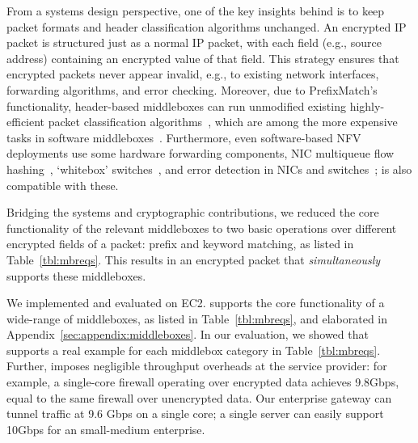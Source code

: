   From a systems design perspective, one of the key insights behind \sys is to keep packet formats and header classification algorithms unchanged. An encrypted IP packet is structured just as a normal IP packet, with each field (e.g., source address) containing an encrypted value of that field.
  This strategy ensures that encrypted packets never appear invalid, e.g., to existing network interfaces, forwarding algorithms, and error checking. 
Moreover, due to PrefixMatch's functionality,  header-based middleboxes can  run unmodified existing highly-efficient packet classification algorithms~\cite{packet_classif}, which are among the more expensive tasks in software 
middleboxes~\cite{comb}.
   Furthermore, even software-based NFV deployments use  some hardware forwarding components, \eg{} NIC multiqueue flow hashing~\cite{nicdocument}, `whitebox' switches~\cite{whitebox}, and error detection in NICs and switches~\cite{nicdocument, ciscov6}; \sys is also compatible with these. %
  
Bridging the systems and cryptographic contributions, we reduced the core functionality of the relevant middleboxes to two basic operations over different encrypted fields of a packet: prefix and keyword matching, as listed in Table~\ref{tbl:mbreqs}. This results in an encrypted packet that {\it simultaneously} supports these middleboxes.

We implemented and evaluated \sys on EC2. \sys supports the core functionality of a wide-range of  middleboxes, as listed in Table~\ref{tbl:mbreqs}, and elaborated in Appendix~\ref{sec:appendix:middleboxes}.
In our evaluation, we showed that \sys supports a real example for each middlebox category in Table~\ref{tbl:mbreqs}.
Further, \sys imposes  negligible throughput overheads at the service provider: for example, a single-core firewall operating over encrypted data achieves 9.8Gbps, equal to the same firewall over unencrypted data.
Our enterprise gateway can tunnel traffic at 9.6 Gbps on a single core;  a single server can easily support 10Gbps for an small-medium enterprise.




